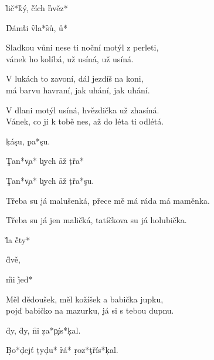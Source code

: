 


\pp{}  \h{lič*}\h{ký,}\p
{}\p {}\h{čích} \h{hvěz*}\p

\h{Dám}\p \h{ti}   \f{vla*}\f{sů,}
   \h{u*}

Sladkou vůni nese ti noční motýl z perleti,\\
vánek ho kolíbá, už usíná, už usíná.

V lukách to zavoní, dál jezdíš na koni,\\
má barvu havraní, jak uhání, jak uhání.

V dlani motýl usíná, hvězdička už zhasíná.\\
Vánek, co ji k tobě nes, až do léta ti odlétá.



\d{ká}\p \c{su,}\p
{} \d{pa*}\pp\c{su.}\p

\c{Tan*}\c{va*} \c{bych}\p {}\p
\f{až}  \d{třa*}\pp{}\p

\c{Tan*}\c{va*} \c{bych}\p {}\p
\f{až}  \d{třa*}\pp\c{su.}\p

Třeba su já malušenká, přece mě má ráda má maměnka.

Třeba su já jen maličká, tatíčkova su já holubička.



\G{la} \pp{}\p
\h{čty*} \pp{}\p

 \pp{}\p {}\p\G{dvě,}\p

 \G{mi} \pp{}\p
\h{jed*} \pp{}\p

\p {}\p {}\pp{}\p

Měl dědoušek, měl kožíšek a babička jupku,\\
pojď babičko na mazurku, já si s tebou dupnu.



 \p{}\f{dy,}
 \p{}\f{dy,}
\f{ni} \d{za*}\c{pís*}\pp\c{kal.}

\d{Bo*}\pp\d{dejť}  \d{ty}\p \d{du*}
\f{rá*} \d{roz*}\c{třís*}\pp\c{kal.}



